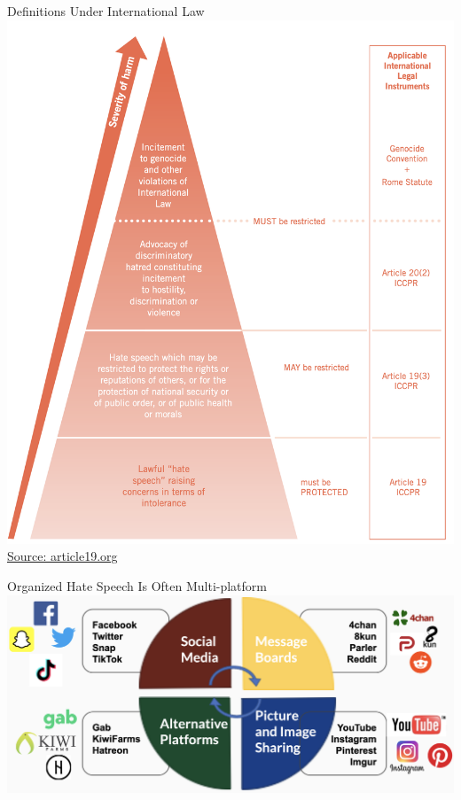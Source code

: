 \documentclass[nobackground,dvipsnames,table]{beamer}
\begin{document}
\begin{frame}{Definitions Under International Law}
    \centering
    \includegraphics[height=0.8\textheight]{hate-speech-pyramid}
    \tiny
    \underline{\href{https://www.article19.org/data/files/medialibrary/38231/'Hate-Speech'-Explained---A-Toolkit-\%282015-Edition\%29.pdf}{Source: article19.org}}
\end{frame}

\begin{frame}{Organized Hate Speech Is Often Multi-platform}
    \includegraphics[width=\textwidth]{multiplatform-hate-speech}
\end{frame}
\end{document}
